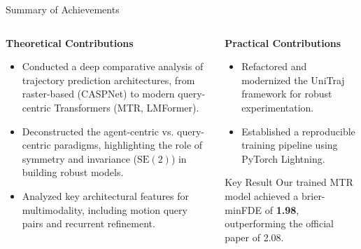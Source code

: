 \documentclass[10pt,aspectratio=169]{beamer}
\begin{document}
\begin{frame}{Summary of Achievements}
    \begin{columns}[T]
        \begin{column}{0.6\textwidth}
            \textbf{Theoretical Contributions}
            \begin{itemize}
                \item Conducted a deep comparative analysis of trajectory prediction architectures, from raster-based (CASPNet) to modern query-centric Transformers (MTR, LMFormer).
                \item Deconstructed the agent-centric vs. query-centric paradigms, highlighting the role of symmetry and invariance ($\mathrm{SE}(2)$) in building robust models.
                \item Analyzed key architectural features for multimodality, including motion query pairs and recurrent refinement.
            \end{itemize}
        \end{column}
        \begin{column}{0.4\textwidth}
            \textbf{Practical Contributions}
            \begin{itemize}
                \item Refactored and modernized the UniTraj framework for robust experimentation.
                \item Established a reproducible training pipeline using PyTorch Lightning.
            \end{itemize}
            \begin{alertblock}{Key Result}
                Our trained MTR model achieved a brier-minFDE of \textbf{1.98}, outperforming the official paper of 2.08.
            \end{alertblock}
        \end{column}
    \end{columns}
\end{frame}

\end{document}
